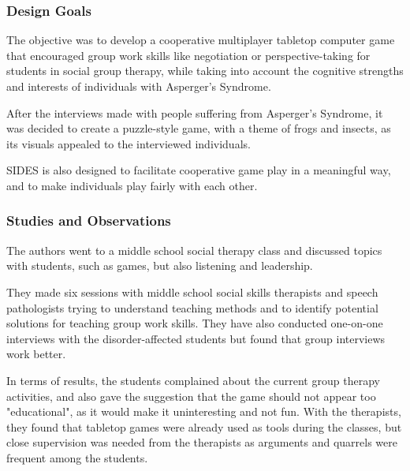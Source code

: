 \documentclass[runningheads]{llncs}
\begin{document}
\subsubsection{Design Goals}
\par The objective was to develop a cooperative multiplayer tabletop computer game that encouraged group work skills like negotiation or perspective-taking for students in social group therapy, while taking into account the cognitive strengths and interests of individuals with Asperger's Syndrome.
\par After the interviews made with people suffering from Asperger's Syndrome, it was decided to create a puzzle-style game, with a theme of frogs and insects, as its visuals appealed to the interviewed individuals. 
\par SIDES is also designed to facilitate cooperative game play in a meaningful way, and to make individuals play fairly with each other.

\subsubsection{Studies and Observations}
\par The authors went to a middle school social therapy class and discussed topics with students, such as games, but also listening and leadership. 
\par They made six sessions with middle school social skills therapists and speech pathologists trying to understand teaching methods and to identify potential solutions for teaching group work skills. They have also conducted one-on-one interviews with the disorder-affected students but found that group interviews work better. 
\par In terms of results, the students complained about the current group therapy activities, and also gave the suggestion that the game should not appear too "educational", as it would make it uninteresting and not fun. With the therapists, they found that tabletop games were already used as tools during the classes, but close supervision was needed from the therapists as arguments and quarrels were frequent among the students.
\end{document}
